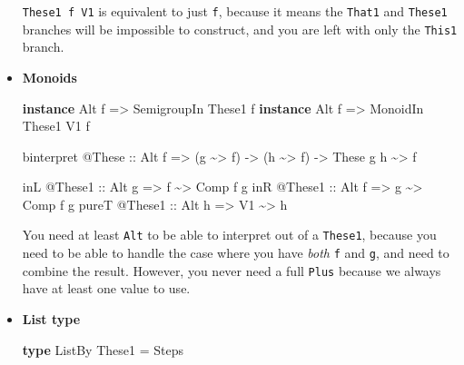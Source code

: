 \documentclass[]{article}
\newenvironment{Shaded}{}{}
\newcommand{\DataTypeTok}[1]{\textcolor[rgb]{0.56,0.13,0.00}{#1}}
\newcommand{\KeywordTok}[1]{\textcolor[rgb]{0.00,0.44,0.13}{\textbf{#1}}}
\newcommand{\NormalTok}[1]{#1}
\newcommand{\OperatorTok}[1]{\textcolor[rgb]{0.40,0.40,0.40}{#1}}
\newcommand{\OtherTok}[1]{\textcolor[rgb]{0.00,0.44,0.13}{#1}}
\begin{document}
\begin{itemize}
  \texttt{These1\ f\ V1} is equivalent to just \texttt{f}, because it means the
  \texttt{That1} and \texttt{These1} branches will be impossible to construct,
  and you are left with only the \texttt{This1} branch.
\item
  \textbf{Monoids}

\begin{Shaded}
\begin{Highlighting}[]
\KeywordTok{instance} \DataTypeTok{Alt}\NormalTok{ f }\OtherTok{=\textgreater{}} \DataTypeTok{SemigroupIn} \DataTypeTok{These1}\NormalTok{ f}
\KeywordTok{instance} \DataTypeTok{Alt}\NormalTok{ f }\OtherTok{=\textgreater{}} \DataTypeTok{MonoidIn}    \DataTypeTok{These1} \DataTypeTok{V1}\NormalTok{ f}

\NormalTok{binterpret }\OperatorTok{@}\DataTypeTok{These}
\OtherTok{    ::} \DataTypeTok{Alt}\NormalTok{ f}
    \OtherTok{=\textgreater{}}\NormalTok{ (g }\OperatorTok{\textasciitilde{}\textgreater{}}\NormalTok{ f)}
    \OtherTok{{-}\textgreater{}}\NormalTok{ (h }\OperatorTok{\textasciitilde{}\textgreater{}}\NormalTok{ f)}
    \OtherTok{{-}\textgreater{}} \DataTypeTok{These}\NormalTok{ g h }\OperatorTok{\textasciitilde{}\textgreater{}}\NormalTok{ f}

\NormalTok{inL   }\OperatorTok{@}\DataTypeTok{These1}\OtherTok{ ::} \DataTypeTok{Alt}\NormalTok{ g }\OtherTok{=\textgreater{}}\NormalTok{ f  }\OperatorTok{\textasciitilde{}\textgreater{}} \DataTypeTok{Comp}\NormalTok{ f g}
\NormalTok{inR   }\OperatorTok{@}\DataTypeTok{These1}\OtherTok{ ::} \DataTypeTok{Alt}\NormalTok{ f }\OtherTok{=\textgreater{}}\NormalTok{ g  }\OperatorTok{\textasciitilde{}\textgreater{}} \DataTypeTok{Comp}\NormalTok{ f g}
\NormalTok{pureT }\OperatorTok{@}\DataTypeTok{These1}\OtherTok{ ::} \DataTypeTok{Alt}\NormalTok{ h }\OtherTok{=\textgreater{}} \DataTypeTok{V1} \OperatorTok{\textasciitilde{}\textgreater{}}\NormalTok{ h}
\end{Highlighting}
\end{Shaded}

  You need at least \texttt{Alt} to be able to interpret out of a
  \texttt{These1}, because you need to be able to handle the case where you have
  \emph{both} \texttt{f} and \texttt{g}, and need to combine the result.
  However, you never need a full \texttt{Plus} because we always have at least
  one value to use.
\item
  \textbf{List type}

\begin{Shaded}
\begin{Highlighting}[]
\KeywordTok{type} \DataTypeTok{ListBy} \DataTypeTok{These1} \OtherTok{=} \DataTypeTok{Steps}
\end{Highlighting}
\end{Shaded}


\end{itemize}
\end{document}
